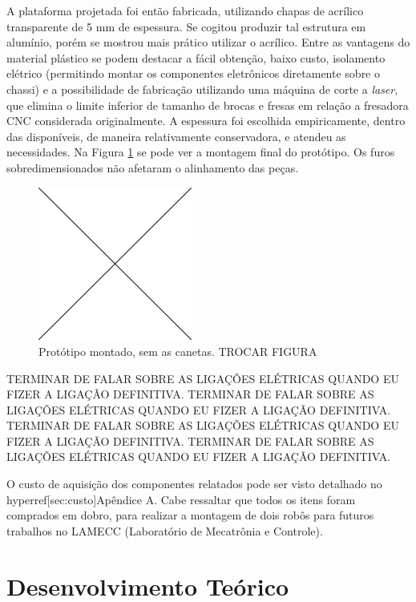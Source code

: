 A plataforma projetada foi então fabricada, utilizando chapas de acrílico transparente de 5 mm de espessura. Se cogitou produzir tal estrutura em alumínio, porém se mostrou mais prático utilizar o acrílico. Entre as vantagens do material plástico se podem destacar a fácil obtenção, baixo custo, isolamento elétrico (permitindo montar os componentes eletrônicos diretamente sobre o chassi) e a possibilidade de fabricação utilizando uma máquina de corte a \textit{laser}, que elimina o limite inferior de tamanho de brocas e fresas em relação a fresadora CNC considerada originalmente. A espessura foi escolhida empiricamente, dentro das disponíveis, de maneira relativamente conservadora, e atendeu as necessidades. Na Figura \ref{fig:montagem} se pode ver a montagem final do protótipo. Os furos sobredimensionados não afetaram o alinhamento das peças.

\begin{figure}[h]
  \centering
  \includegraphics[width = 0.45\textwidth]{imagens/edc}
  \caption{Protótipo montado, sem as canetas. TROCAR FIGURA}
  \label{fig:montagem}
\end{figure}

TERMINAR DE FALAR SOBRE AS LIGAÇÕES ELÉTRICAS QUANDO EU FIZER A LIGAÇÃO DEFINITIVA.
TERMINAR DE FALAR SOBRE AS LIGAÇÕES ELÉTRICAS QUANDO EU FIZER A LIGAÇÃO DEFINITIVA.
TERMINAR DE FALAR SOBRE AS LIGAÇÕES ELÉTRICAS QUANDO EU FIZER A LIGAÇÃO DEFINITIVA.
TERMINAR DE FALAR SOBRE AS LIGAÇÕES ELÉTRICAS QUANDO EU FIZER A LIGAÇÃO DEFINITIVA.

O custo de aquisição dos componentes relatados pode ser visto detalhado no hyperref[sec:custo]{Apêndice A}. Cabe ressaltar que todos os itens foram comprados em dobro, para realizar a montagem de dois robôs para futuros trabalhos no LAMECC (Laboratório de Mecatrônia e Controle).

\section{Desenvolvimento Teórico}
\label{sec:teorico}

